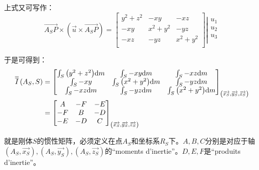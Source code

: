 \documentclass[UTF8]{ctexart}%
\begin{document}
上式又可写作：
\begin{equation}
\overrightarrow{A_SP}\times \left( \overrightarrow{u}\times \overrightarrow{A_SP} \right) =\left[ \begin{matrix}
	y^2+z^2&		-xy&		-xz\\
	-xy&		x^2+y^2&		-yz\\
	-xz&		-yz&		x^2+y^2\\
\end{matrix} \right] \left| \begin{array}{c}
	u_1\\
	u_2\\
	u_3\\
\end{array} \right. 
\end{equation}

于是可得到：
\begin{align}
\overline{\overline{I}}\left( A_S,S \right)&=\left[ \begin{matrix}
	\int_S{\left( y^2+z^2 \right)}\text{d}m&		\int_S{-xy}\text{d}m&		\int_S{-xz}\text{d}m\\
	\int_S{-xy}&		\int_S{\left( x^2+y^2 \right)}\text{d}m&		\int_S{-yz}\text{d}m\\
	\int_S{-xz}\text{d}m&		\int_S{-yz}\text{d}m&		\int_S{\left( x^2+y^2 \right)}\text{d}m\\
\end{matrix} \right]_{\left(\overrightarrow{x_S},\overrightarrow{y_S},\overrightarrow{z_S}\right)}\notag\\ &=\left[ \begin{matrix}
	A&		-F&		-E\\
	-F&		B&		-D\\
	-E&		-D&		C\\
\end{matrix} \right]_{\left( \overrightarrow{x_S},\overrightarrow{y_S},\overrightarrow{z_S} \right)}
\label{eq:matriceinertiedusolideS}
\end{align}

就是刚体$S$的惯性矩阵，必须定义在点$A_S$和坐标系$R_S$下。$A,B,C$分别是对应于轴$\left( A_S,\overrightarrow{x_S} \right) ,\left( A_S,\overrightarrow{y_S} \right) ,\left( A_S,\overrightarrow{z_S} \right) $的``moments d'inertie''。$D,E,F$是``produits d'inertie''。

%
%
%
\end{document}
